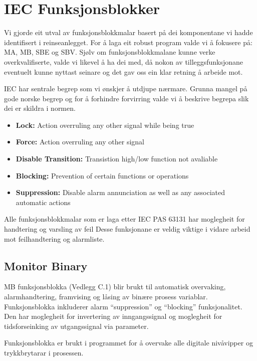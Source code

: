 \section{IEC Funksjonsblokker} \label{IEC Seksjon}
\thispagestyle{fancy}

Vi gjorde eit utval av funksjonsblokkmalar basert på dei komponentane vi hadde identifisert i reinseanlegget.
For å laga eit robust program valde vi å fokusere på: \gls{MA}, \gls{MB}, \gls{SBE} og \gls{SBV}.
Sjølv om funksjonsblokkmalane kunne verke overkvalifiserte, valde vi likevel å ha dei med, då nokon av tilleggsfunksjonane eventuelt kunne nyttast seinare
og det gav oss ein klar retning å arbeide mot.

\gls{IEC} har sentrale begrep som vi ønskjer å utdjupe nærmare. Grunna mangel på gode norske begrep
og for å forhindre forvirring valde vi å beskrive begrepa slik dei er skildra i normen.

\begin{itemize}
    \item \textbf{Lock:} Action overruling any other signal while being true
    \item \textbf{Force:} Action overruling any other signal
    \item \textbf{Disable Transition:} Transistion high/low function not avaliable
    \item \textbf{Blocking:} Prevention of certain functions or operations 
    \item \textbf{Suppression:} Disable alarm annunciation as well as any associated automatic actions
\end{itemize}

Alle funksjonsblokkmalar som er laga etter \gls{IEC} \gls{PAS} 63131 har moglegheit for handtering og varsling av feil 
Desse funksjonane er veldig viktige i vidare arbeid mot feilhandtering og alarmliste.

\newpage

\subsection{Monitor Binary}
\gls{MB} funksjonsblokka (Vedlegg C.1) blir brukt til automatisk overvaking, alarmhandtering, framvising og låsing av binære prosess variablar.
Funksjonsblokka inkluderer alarm ``suppression'' og ``blocking'' funksjonalitet. Den har moglegheit for invertering av 
inngangssignal og moglegheit for tidsforseinking av utgangssignal via parameter.

Funksjonsblokka er brukt i programmet for å overvake alle digitale nivåvipper og trykkbrytarar i prosessen.


